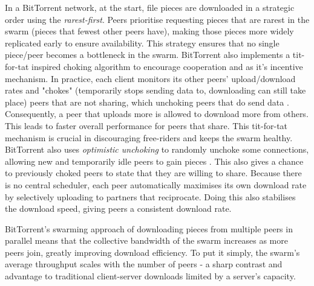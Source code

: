 \documentclass[12pt,a4paper]{report}
\begin{document}
In a BitTorrent network, at the start, file pieces are downloaded in a strategic order using the \textit{rarest-first}. Peers prioritise requesting pieces that are rarest in the swarm (pieces that fewest other peers have), making those pieces more widely replicated early to ensure availability. This strategy ensures that no single piece/peer becomes a bottleneck in the swarm. BitTorrent also implements a tit-for-tat inspired choking algorithm to encourage cooperation and as it's incentive mechanism. In practice, each client monitors its other peers' upload/download rates and "chokes" (temporarily stops sending data to, downloading can still take place) peers that are not sharing, which unchoking peers that do send data \cite{choking}. Consequently, a peer that uploads more is allowed to download more from others. This leads to faster overall performance for peers that share. This tit-for-tat mechanism is crucial in discouraging free-riders and keeps the swarm healthy. BitTorrent also uses \textit{optimistic unchoking} to randomly unchoke some connections, allowing new and temporarily idle peers to gain pieces \cite{choking}. This also gives a chance to previously choked peers to state that they are willing to share. Because there is no central scheduler, each peer automatically maximises its own download rate by selectively uploading to partners that reciprocate. Doing this also stabilises the download speed, giving peers a consistent download rate.

BitTorrent's swarming approach of downloading pieces from multiple peers in parallel means that the collective bandwidth of the swarm increases as more peers join, greatly improving download efficiency. To put it simply, the swarm's average throughput scales with the number of peers - a sharp contrast and advantage to traditional client-server downloads limited by a server's capacity.
\end{document}
